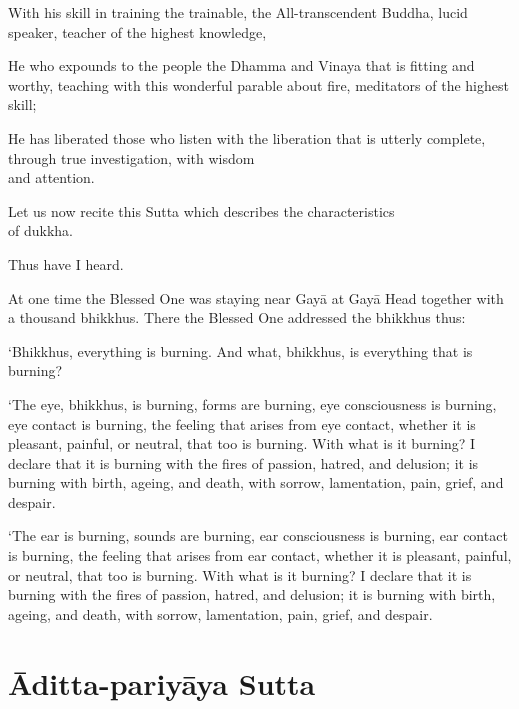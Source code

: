 \begin{leader}

With his skill in training the trainable, the All-transcendent Buddha,
lucid speaker, teacher of the highest knowledge,

He who expounds to the people the Dhamma and Vinaya that is fitting and
worthy, teaching with this wonderful parable about fire, meditators of
the highest skill;

He has liberated those who listen with the liberation that is utterly
complete, through true investigation, with wisdom\\ and attention.

Let us now recite this Sutta which describes the characteristics\\ of dukkha.

\end{leader}

Thus have I heard.

At one time the Blessed One was staying near Gayā at Gayā Head together
with a thousand bhikkhus. There the Blessed One addressed the bhikkhus
thus:

‘Bhikkhus, everything is burning. And what, bhikkhus, is everything
that is burning?

‘The eye, bhikkhus, is burning, forms are burning, eye consciousness is
burning, eye contact is burning, the feeling that arises from eye
contact, whether it is pleasant, painful, or neutral, that too is
burning. With what is it burning? I declare that it is burning with the
fires of passion, hatred, and delusion; it is burning with birth,
ageing, and death, with sorrow, lamentation, pain, grief, and despair.

\enlargethispage{2\baselineskip}

‘The ear is burning, sounds are burning, ear consciousness is burning,
ear contact is burning, the feeling that arises from ear contact,
whether it is pleasant, painful, or neutral, that too is burning. With
what is it burning? I declare that it is burning with the fires of
passion, hatred, and delusion; it is burning with birth, ageing, and
death, with sorrow, lamentation, pain, grief, and despair.

\chapterTocSubIndentTrue
\chapter{Āditta-pariyāya Sutta}

\paliText
\renewcommand{\paliTitle}{Āditta-pariyāya Sutta}

